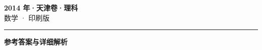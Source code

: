 \documentclass[zihao=5, a4paper]{ctexart}
\begin{document}
\begin{center}
  {\Large\bfseries 2014 年·天津卷·理科}\\[4pt]
  {\large 数学 · 印刷版}
\end{center}
\medskip
{}

\par\bigskip\hrule\bigskip
{}
\Needspace{0.55\textheight}
\begin{center}{\large\bfseries 参考答案与详细解析}\end{center}
\smallskip

\end{document}
